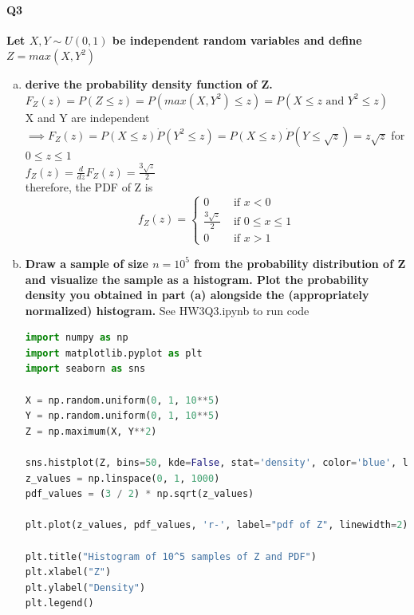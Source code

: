 \documentclass[10pt,letterpaper]{article}
\begin{document}
\paragraph{Q3}
\textbf{Let $X, Y \sim U(0,1)$ be independent random variables and define $Z = max(X, Y^2)$}
\begin{enumerate}[(a)]
    \item \textbf{derive the probability density function of Z.}\\
    $F_Z(z) = P(Z\leq z) = P(max(X, Y^2) \leq z) = P(X \leq z \text{ and } Y^2 \leq z)$\\
    X and Y are independent $\implies F_Z(z) = P(X\leq z) \dot P(Y^2\leq z) = P(X\leq z) \dot P(Y\leq \sqrt{z}) = z\sqrt{z}$ for $0\leq z \leq 1$\\
    $f_Z(z) = \frac{d}{dz} F_Z(z) = \frac{3\sqrt{z}}{2}$\\
    therefore, the PDF of Z is 
    $$f_Z(z) = \begin{cases}
    0 & \text{ if } x < 0\\
    \frac{3\sqrt{z}}{2} & \text{ if } 0 \leq x \leq 1\\
    0 & \text{ if } x > 1
\end{cases}$$
    \item \textbf{Draw a sample of size $n = 10^5$ from the probability distribution of Z and visualize the sample as a histogram. Plot the probability density you obtained in part (a) alongside the (appropriately normalized) histogram.}
    See HW3Q3.ipynb to run code\\
    \begin{lstlisting}[language=Python]
import numpy as np
import matplotlib.pyplot as plt
import seaborn as sns

X = np.random.uniform(0, 1, 10**5)
Y = np.random.uniform(0, 1, 10**5)
Z = np.maximum(X, Y**2)

sns.histplot(Z, bins=50, kde=False, stat='density', color='blue', label="Sampled Z")
z_values = np.linspace(0, 1, 1000)
pdf_values = (3 / 2) * np.sqrt(z_values)

plt.plot(z_values, pdf_values, 'r-', label="pdf of Z", linewidth=2)

plt.title("Histogram of 10^5 samples of Z and PDF")
plt.xlabel("Z")
plt.ylabel("Density")
plt.legend()


\end{lstlisting}
\end{enumerate}
\end{document}
